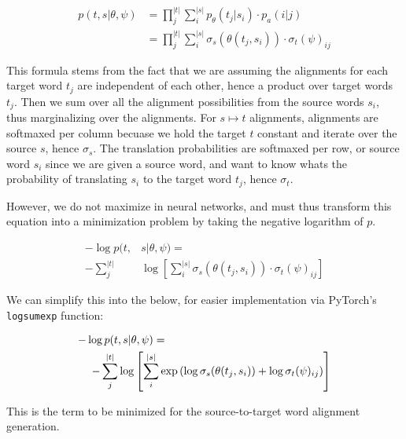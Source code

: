 \documentclass[twoside,twocolumn]{article}
\begin{document}
\begin{equation}
  \begin{split}
  p(t, s | \theta, \psi)
    &= \prod_j^{|t|} \sum_i^{|s|} p_\theta(t_j| s_i) \cdot p_a(i|j) \\
    &= \prod_j^{|t|} \sum_i^{|s|} \sigma_s(\theta(t_j, s_i)) \cdot \sigma_t(\psi)_{ij}
  \end{split}
\end{equation}

This formula stems from the fact that we are assuming the alignments for each
target word $t_j$ are independent of each other, hence a product over target
words $t_j$. Then we sum over all the alignment possibilities from the source
words $s_i$, thus marginalizing over the alignments. For $s \mapsto t$ alignments, alignments are softmaxed per column becuase we hold the target $t$ constant and iterate over the source $s$, hence $\sigma_s$. The translation probabilities are softmaxed per row, or source word $s_i$ since we are given a source word, and want to know whats the probability of translating $s_i$ to the target word $t_j$, hence $\sigma_t$.

However, we do not maximize in neural networks, and must thus transform this
equation into a minimization problem by taking the negative logarithm of $p$.

\begin{equation}
  \begin{split}
  -\log p(t, & s | \theta, \psi) = \\
  - \sum_j^{|t|}
    & \log \left[ \sum_i^{|s|} \sigma_s \left( \theta(t_j, s_i) \right) \cdot
      \sigma_t(\psi)_{ij} \right]
\end{split}
\end{equation}

We can simplify this into the below, for easier implementation via PyTorch's
\texttt{logsumexp} function:

\begin{equation}
  \centering
  \begin{split}
  -\log  p(t & , s | \theta, \psi) = \\
  - \sum_j^{|t|} & \log \left[ \sum_i^{|s|} \exp
      \left( \log \sigma_s(\theta(t_j, s_i)) + \log \sigma_t(\psi)_{ij} \right)
    \right]
\end{split}
\end{equation}

This is the term to be minimized for the source-to-target word alignment
generation.
\end{document}

